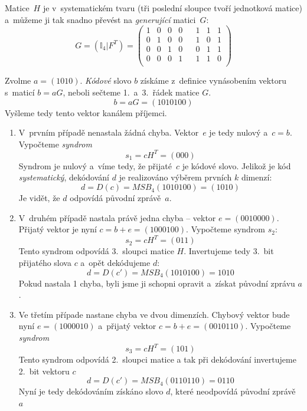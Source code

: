 \documentclass[thesis=M,czech,hidelinks]{FITthesis}[2012/06/26]
\newcommand{\0}{{\textcolor[gray]{0.75}{0}}}
\begin{document}
Matice~$H$ je v~systematickém tvaru (tři poslední sloupce tvoří jednotková
matice) a~můžeme ji tak snadno převést na \emph{generující} matici~$G$:
$$
    G = \left( \mathbb{I}_4 | F^T \right) = \left(
    \begin{array}{*{8}{c}}
        1 & 0 & 0 & 0 & & 1 & 1 & 1 \\
        0 & 1 & 0 & 0 & & 1 & 0 & 1 \\
        0 & 0 & 1 & 0 & & 0 & 1 & 1 \\
        0 & 0 & 0 & 1 & & 1 & 1 & 0 \\
    \end{array}
    \right)
$$

Zvolme $a=(1010)$. \emph{Kódové} slovo $b$ získáme z~definice vynásobením
vektoru s~maticí $b = aG$, neboli sečteme 1.~a~3.~řádek matice $G$.
$$ b = aG = (1010100) $$
Vyšleme tedy tento vektor kanálem příjemci.


\begin{enumerate}
    \item V~prvním případě nenastala žádná chyba. Vektor~$e$ je
        tedy nulový a~$c = b$. Vypočteme \emph{syndrom}
        $$ s_1 = c H^T = (000) $$
        Syndrom je nulový a~víme tedy, že přijaté~$c$ je kódové slovo.
        Jelikož je kód \emph{systematický}, dekódování $d$ je realizováno
        výběrem prvních $k$ dimenzí:
        $$ d = D(c) = MSB_4(1010100) = (1010) $$
        Je vidět, že $d$ odpovídá původní zprávě~$a$.

    \item V~druhém případě nastala právě jedna chyba -- vektor $e=(0010000)$.
        Přijatý vektor je nyní $c = b + e = (1000100)$. Vypočteme syndrom $s_2$:
        $$ s_2 = c H^T = (011) $$
        Tento syndrom odpovídá 3.~sloupci matice $H$. Invertujeme tedy 3.~bit
        přijatého slova $c$ a~opět dekódujeme $d$:
        $$ d = D(c') = MSB_4(1010100) = 1010 $$
        Pokud nastala 1 chyba, byli jsme ji schopni opravit a~získat původní
        zprávu $a$.

    \item Ve třetím případe nastane chyba ve dvou dimenzích. Chybový vektor bude
        nyní $e=(1000010)$ a~přijatý vektor $c = b + e = (0010110)$. Vypočteme
        \emph{syndrom}
        $$ s_3 = c H^T = (101) $$
        Tento syndrom odpovídá 2.~sloupci matice a tak při dekódování
        invertujeme 2.~bit vektoru $c$
        $$ d = D(c') = MSB_4(0110110) = 0110 $$
        Nyní je tedy dekódováním získáno slovo $d$, které neodpovídá původní
        zprávě $a$

\end{enumerate}
\end{document}
